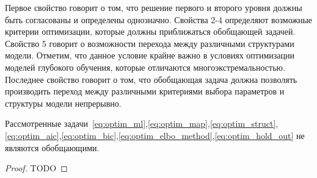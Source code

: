 Первое свойство говорит о том, что решение первого и второго уровня должны быть согласованы и определены однозначно.
Свойства 2-4 определяют возможные критерии оптимизации, которые должны приближаться обобщающей задачей.
Свойство 5 говорит о возможности перехода между различными структурами модели. Отметим, что данное условие крайне важно в условиях оптимизации моделей глубокого обучения, которые отличаются многоэкстремальностью.
Последнее свойство говорит о том, что обобщающая задача должна позволять производить переход между различными критериями выбора  параметров и структуры модели непрерывно.

\begin{theorem}Рассмотренные задачи~\eqref{eq:optim_ml},\eqref{eq:optim_map},\eqref{eq:optim_struct},\eqref{eq:optim_aic},\eqref{eq:optim_bic},\eqref{eq:optim_elbo_method},\eqref{eq:optim_hold_out} не являются обобщающими.
\end{theorem}
\begin{proof}
TODO
\end{proof}

